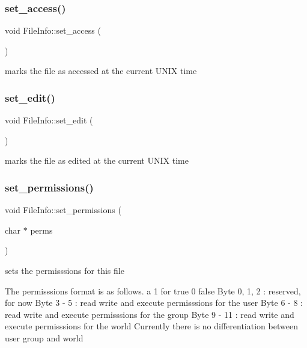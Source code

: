 \subsubsection{\texorpdfstring{set\+\_\+access()}{set\_access()}}
{\footnotesize\ttfamily void File\+Info\+::set\+\_\+access (\begin{DoxyParamCaption}{ }\end{DoxyParamCaption})}

marks the file as accessed at the current U\+N\+IX time \mbox{\label{classFileInfo_a05eb10c6804660ecd47e556c27ecd019}} 
\subsubsection{\texorpdfstring{set\+\_\+edit()}{set\_edit()}}
{\footnotesize\ttfamily void File\+Info\+::set\+\_\+edit (\begin{DoxyParamCaption}{ }\end{DoxyParamCaption})}

marks the file as edited at the current U\+N\+IX time \mbox{\label{classFileInfo_a377208012195dba0b24723837f6db39f}} 
\subsubsection{\texorpdfstring{set\+\_\+permissions()}{set\_permissions()}}
{\footnotesize\ttfamily void File\+Info\+::set\+\_\+permissions (\begin{DoxyParamCaption}\item[{char $\ast$}]{perms }\end{DoxyParamCaption})}



sets the permisssions for this file 

The permisssions format is as follows. a 1 for true 0 false Byte 0, 1, 2 \+: reserved, for now Byte 3 -\/ 5 \+: read write and execute permisssions for the user Byte 6 -\/ 8 \+: read write and execute permisssions for the group Byte 9 -\/ 11 \+: read write and execute permisssions for the world Currently there is no differentiation between user group and world


